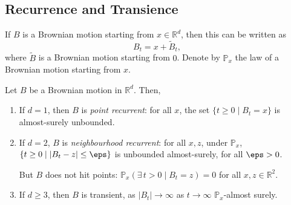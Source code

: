\documentclass[12pt]{article}
\begin{document}
\subsection{Recurrence and Transience}%
\label{sub:rat}

If $B$ is a Brownian motion starting from $x \in \mathbb{R}^d$, then this can be written as
\[
B_t = x + \tilde B_t,
\]
where $\tilde B$ is a Brownian motion starting from $0$. Denote by $\mathbb{P}_x$ the law of a Brownian motion starting from $x$.

\begin{theorem}
	Let $B$ be a Brownian motion in $\mathbb{R}^d$. Then,
	\begin{enumerate}[\normalfont(i)]
		\item If $d = 1$, then $B$ is \emph{point recurrent}: for all $x$, the set $\{t \geq 0 \mid B_t = x\}$ is almost-surely unbounded.
		\item If $d = 2$, $B$ is \emph{neighbourhood recurrent}: for all $x, z$, under $\mathbb{P}_x$, $\{t \geq 0 \mid |B_t - z| \leq \eps\}$ is unbounded almost-surely, for all $\eps > 0$.

			But $B$ does not hit points: $\mathbb{P}_x(\exists \, t > 0 \mid B_t = z) = 0$ for all  $x, z \in \mathbb{R}^2$.
		\item If $d \geq 3$, then $B$ is transient, as $|B_t| \to \infty$ as $t \to \infty$ $\mathbb{P}_x$-almost surely.
	\end{enumerate}	
\end{theorem}
\end{document}
